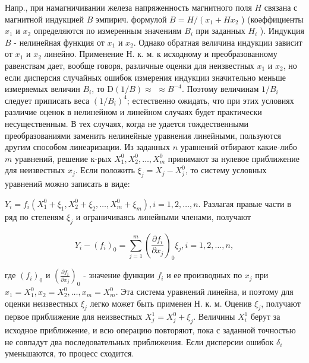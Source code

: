 \documentclass[10pt]{article}
\begin{document}
Напр., при намагничивании железа напряженность магнитного поля $H$ связана с магнитной индукцией $B$ эмпирич. формулой $B=H /\left(x_{1}+H x_{2}\right.$ ) (коәффициенты $x_{1}$ и $x_{2}$ определяются по измеренным значениям $B_{i}$ при заданных $H_{i}$ ). Индукция $B$ - нелинейная функция от $x_{1}$ и $x_{2}$. Однако обратная величина индукции зависит от $x_{1}$ и $x_{2}$ линейно. Применение Н. к. м. к исходному и преобразованному равенствам дает, вообще говоря, различные оценки для неизвестных $x_{1}$ и $x_{2}$, но если дисперсия случайных ошибок измерения индукции значительно меньше измеряемых величин $B_{i}$, то $\mathrm{D}(1 / B) \approx$ $\approx B^{-4}$. Поэтому величинам $1 / B_{i}$ следует приписать веса $\left(1 / B_{i}\right)^{4}$; естественно ожидать, что при этих условиях различие оценок в нелинейном и линейном случаях будет практически несущественным. В тех случаях, когда не удается тождественными преобразованиями заменить нелинейные уравнения линейными, пользуются другим способом линеаризации. Из заданных $n$ уравнений отбирают какие-либо $m$ уравнений, решение к-рых $X_{1}^{0}, X_{2}^{0}, \ldots, X_{m}^{0}$ принимают за нулевое приближение для неизвестных $x_{j}$. Если положить $\xi_{j}=X_{j}-X_{j}^{0}$, то систему условных уравнений можно записать в виде:



$Y_{i}=f_{i}\left(X_{1}^{0}+\xi_{1}, X_{2}^{0}+\xi_{2}, \ldots, X_{m}^{0}+\xi_{m}\right), i=1,2, \ldots, n$. Разлагая правые части в ряд по степеням $\xi_{j}$ и ограничиваясь линейными членами, получают



\[

Y_{i}-\left(f_{i}\right)_{0}=\sum_{j=1}^{m}\left(\frac{\partial f_{i}}{\partial x_{j}}\right)_{0} \xi_{j}, i=1,2, \ldots, n,

\]



где $\left(f_{i}\right)_{0}$ и $\left(\frac{\partial f_{i}}{\partial x_{j}}\right)_{0}$ - значение функции $f_{i}$ и ее производных по $x_{j}$ при $x_{1}=X_{1}^{0}, x_{2}=X_{2}^{0}, \ldots, x_{m}=X_{m}^{0}$. Эта система уравнений линейна, и поэтому для оценки неизвестных $\xi_{j}$ легко может быть применен Н. к. м. Оценив $\xi_{j}$, получают первое приближение для неизвестных $X_{j}^{1}=X_{j}^{0}+\xi_{j}$. Величины $X_{i}^{1}$ берут за исходное приближение, и всю операцию повторяют, пока с заданной точностью не совпадут два последовательных приближения. Если дисперсии ошибок $\delta_{i}$ уменьшаются, то процесс сходится.
\end{document}
